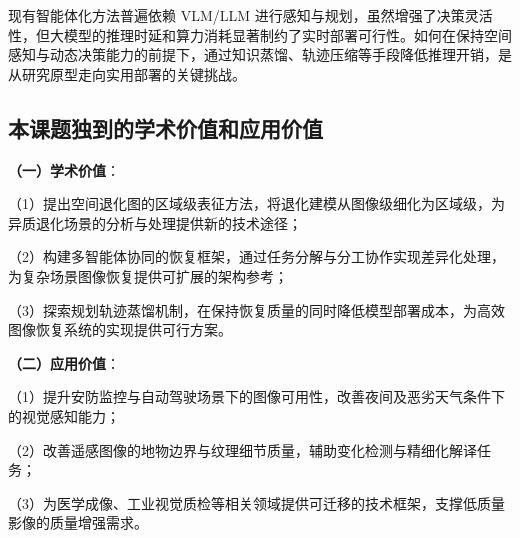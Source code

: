 现有智能体化方法普遍依赖 VLM/LLM 进行感知与规划，虽然增强了决策灵活性，但大模型的推理时延和算力消耗显著制约了实时部署可行性。如何在保持空间感知与动态决策能力的前提下，通过知识蒸馏、轨迹压缩等手段降低推理开销，是从研究原型走向实用部署的关键挑战。

\subsection{本课题独到的学术价值和应用价值}

\textbf{（一）学术价值}：

（1）提出空间退化图的区域级表征方法，将退化建模从图像级细化为区域级，为异质退化场景的分析与处理提供新的技术途径；

（2）构建多智能体协同的恢复框架，通过任务分解与分工协作实现差异化处理，为复杂场景图像恢复提供可扩展的架构参考；

（3）探索规划轨迹蒸馏机制，在保持恢复质量的同时降低模型部署成本，为高效图像恢复系统的实现提供可行方案。

\textbf{（二）应用价值}：

（1）提升安防监控与自动驾驶场景下的图像可用性，改善夜间及恶劣天气条件下的视觉感知能力；

（2）改善遥感图像的地物边界与纹理细节质量，辅助变化检测与精细化解译任务；

（3）为医学成像、工业视觉质检等相关领域提供可迁移的技术框架，支撑低质量影像的质量增强需求。
